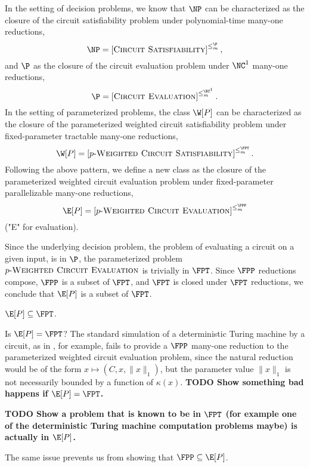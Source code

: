\documentclass{article}
\newcommand{\todo}[1]{\textbf{TODO #1}}
\newcommand{\dash}{\textnormal{-}}
\newcommand{\pwce}{p\dash\textsc{Weighted Circuit Evaluation}}
\newcommand{\cl}[1]{\left[{#1}\right]}
\begin{document}
In the setting of decision problems, we know that $\NP$ can be characterized as the closure of the circuit satisfiability problem under polynomial-time many-one reductions,
\[
\NP = \cl{\textsc{Circuit Satisfiability}}^{\leq_m^\P},
\]
and $\P$ as the closure of the circuit evaluation problem under $\NC^1$ many-one reductions,
\[
\P = \cl{\textsc{Circuit Evaluation}}^{\leq_m^{\NC^1}}.
\]
In the setting of parameterized problems, the class $\W[P]$ can be characterized as the closure of the parameterized weighted circuit satisfiability problem under fixed-parameter tractable many-one reductions,
\[
\W[P] = \cl{p\dash\textsc{Weighted Circuit Satisfiability}}^{\leq_m^{\FPT}}.
\]
Following the above pattern, we define a new class as the closure of the parameterized weighted circuit evaluation problem under fixed-parameter parallelizable many-one reductions,
\[
\E[P] = \cl{\pwce}^{\leq_m^{\FPP}}
\]
("E" for evaluation).

Since the underlying decision problem, the problem of evaluating a circuit on a given input, is in $\P$, the parameterized problem $\pwce$ is trivially in $\FPT$.
Since $\FPP$ reductions compose, $\FPP$ is a subset of $\FPT$, and $\FPT$ is closed under $\FPT$ reductions, we conclude that $\E[P]$ is a subset of $\FPT$.

\begin{theorem}
  $\E[P] \subseteq \FPT$.
\end{theorem}

Is $\E[P] = \FPT$?
The standard simulation of a deterministic Turing machine by a circuit, as in \autocite{ladner75}, for example, fails to provide a $\FPP$ many-one reduction to the parameterized weighted circuit evaluation problem, since the natural reduction would be of the form $x \mapsto (C, x, \|x\|_1)$, but the parameter value $\|x\|_1$ is not necessarily bounded by a function of $\kappa(x)$.
\todo{Show something bad happens if $\E[P] = \FPT$.}

\todo{Show a problem that is known to be in $\FPT$ (for example one of the deterministic Turing machine computation problems maybe) is actually in $\E[P]$.}

The same issue prevents us from showing that $\FPP \subseteq \E[P]$.

\printbibliography
\end{document}
